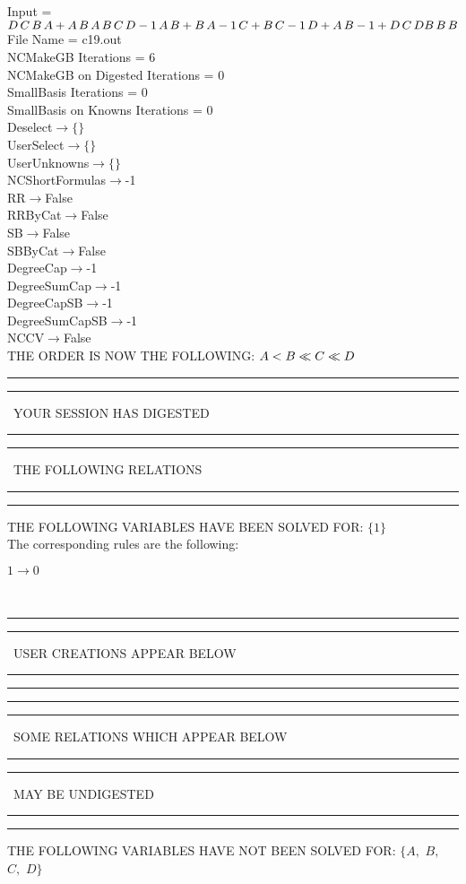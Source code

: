 \documentclass[rep10,leqno]{report}
\begin{document}
\normalsize
\baselineskip=12pt
\noindent
Input = 
$
\\D\,
 C\,
 B\,
 A + A\,
 B\,
 A\,
 B\,
 C\,
 D\\
-1\,
 A\,
 B + B\,
 A\\
-1\,
 C + B\,
 C\\
-1\,
 D + A\,
 B\\
-1 + D\,
 C\,
 D\\
B\,
 B\,
 B\\
$
File Name = c19.out\\
NCMakeGB Iterations = 6\\
NCMakeGB on Digested Iterations = 0\\
SmallBasis Iterations = 0\\
SmallBasis on Knowns Iterations = 0\\
Deselect$\rightarrow \{\}$\\
UserSelect$\rightarrow \{\}$\\
UserUnknowns$\rightarrow \{\}$\\
NCShortFormulas$\rightarrow$-1\\
RR$\rightarrow $False\\
RRByCat$\rightarrow $False\\
SB$\rightarrow $False\\
SBByCat$\rightarrow $False\\
DegreeCap$\rightarrow $-1\\
DegreeSumCap$\rightarrow $-1\\
DegreeCapSB$\rightarrow $-1\\
DegreeSumCapSB$\rightarrow $-1\\
NCCV$\rightarrow $False\\
THE ORDER IS NOW THE FOLLOWING:\hfil\break
$
A<B\ll
C\ll
D\\
$
\rule[2pt]{6in}{4pt}\hfil\break
\rule[2pt]{1.879in}{4pt}
\ YOUR SESSION HAS DIGESTED\ 
\rule[2pt]{1.879in}{4pt}\hfil\break
\rule[2pt]{1.923in}{4pt}
\ THE FOLLOWING RELATIONS\ 
\rule[2pt]{1.923in}{4pt}\hfil\break
\rule[2pt]{6in}{4pt}\hfil\break
THE FOLLOWING VARIABLES HAVE BEEN SOLVED FOR:\hfil\break
$\{1\}$
\smallskip\\
The corresponding rules are the following:\smallskip\\
\begin{minipage}{6in}
$
1\rightarrow 0
$
\end{minipage}\medskip\\
\rule[2pt]{6in}{1pt}\hfil\break
\rule[2.5pt]{1.701in}{1pt}
\ USER CREATIONS APPEAR BELOW\ 
\rule[2.5pt]{1.701in}{1pt}\hfil\break
\rule[2pt]{6in}{1pt}\hfil\break
\rule[2pt]{6in}{4pt}\hfil\break
\rule[2pt]{1.45in}{4pt}
\ SOME RELATIONS WHICH APPEAR BELOW\ 
\rule[2pt]{1.45in}{4pt}\hfil\break
\rule[2pt]{2.18in}{4pt}
\ MAY BE UNDIGESTED\ 
\rule[2pt]{2.18in}{4pt}\hfil\break
\rule[2pt]{6in}{4pt}\hfil\break
THE FOLLOWING VARIABLES HAVE NOT BEEN SOLVED FOR:\hfil\break
$\{A,
$ $
B,
$ $
C,
$ $
D\}$
\smallskip\\
\vspace{10pt}
\end{document}
